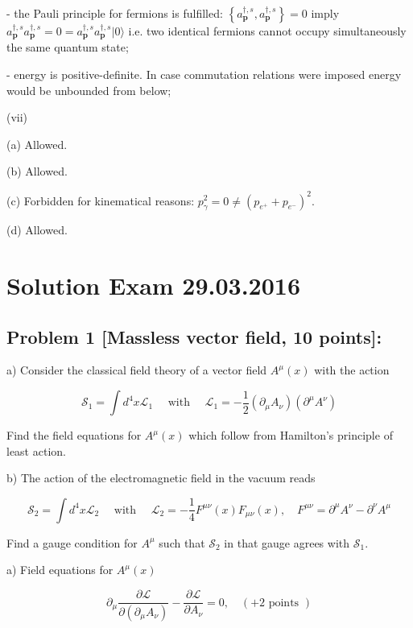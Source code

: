 \documentclass[10pt, letterpaper]{article}
\begin{document}
- the Pauli principle for fermions is fulfilled: $\left\{a_{\mathbf{p}}^{\dagger, s}, a_{\mathbf{p}}^{\dagger, s}\right\}=0$ imply $a_{\mathbf{p}}^{\dagger, s} a_{\mathbf{p}}^{\dagger, s}=0= a_{\mathbf{p}}^{\dagger, s} a_{\mathbf{p}}^{\dagger, s}|0\rangle$ i.e. two identical fermions cannot occupy simultaneously the same quantum state;

- energy is positive-definite. In case commutation relations were imposed energy would be unbounded from below;

(vii) 

(a) Allowed.

(b) Allowed.

(c) Forbidden for kinematical reasons: $p_\gamma^2=0 \neq\left(p_{e^{+}}+p_{e^{-}}\right)^2$.

(d) Allowed.

\pagebreak

\section{Solution Exam 29.03.2016}


\subsection{Problem 1 [Massless vector field, 10 points]:}

a) Consider the classical field theory of a vector field $A^\mu(x)$ with the action

$$
\mathcal{S}_1=\int d^4 x \mathcal{L}_1 \quad \text { with } \quad \mathcal{L}_1=-\frac{1}{2}\left(\partial_\mu A_\nu\right)\left(\partial^\mu A^\nu\right)
$$

Find the field equations for $A^\mu(x)$ which follow from Hamilton's principle of least action.

b) The action of the electromagnetic field in the vacuum reads

$$
\mathcal{S}_2=\int d^4 x \mathcal{L}_2 \quad \text { with } \quad \mathcal{L}_2=-\frac{1}{4} F^{\mu \nu}(x) F_{\mu \nu}(x), \quad F^{\mu \nu}=\partial^\mu A^\nu-\partial^\nu A^\mu
$$


Find a gauge condition for $A^\mu$ such that $\mathcal{S}_2$ in that gauge agrees with $\mathcal{S}_1$.


a) Field equations for $A^\mu(x)$

$$
\partial_\mu \frac{\partial \mathcal{L}}{\partial\left(\partial_\mu A_\nu\right)}-\frac{\partial \mathcal{L}}{\partial A_\nu}=0, \quad(+2 \text { points })
$$
\end{document}
